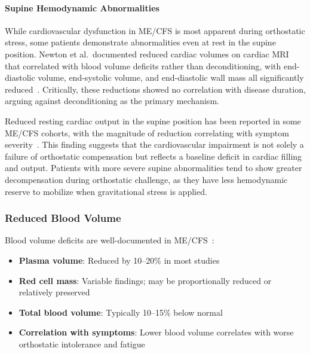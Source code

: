 \paragraph{Supine Hemodynamic Abnormalities}
While cardiovascular dysfunction in ME/CFS is most apparent during orthostatic stress, some patients demonstrate abnormalities even at rest in the supine position. Newton et al.\ documented reduced cardiac volumes on cardiac MRI that correlated with blood volume deficits rather than deconditioning, with end-diastolic volume, end-systolic volume, and end-diastolic wall mass all significantly reduced~\cite{Newton2016}. Critically, these reductions showed no correlation with disease duration, arguing against deconditioning as the primary mechanism.

Reduced resting cardiac output in the supine position has been reported in some ME/CFS cohorts, with the magnitude of reduction correlating with symptom severity~\cite{Newton2016}. This finding suggests that the cardiovascular impairment is not solely a failure of orthostatic compensation but reflects a baseline deficit in cardiac filling and output. Patients with more severe supine abnormalities tend to show greater decompensation during orthostatic challenge, as they have less hemodynamic reserve to mobilize when gravitational stress is applied.

\subsubsection{Reduced Blood Volume}

Blood volume deficits are well-documented in ME/CFS~\cite{Streeten1998blood,Newton2016,Raj2005}:

\begin{itemize}
    \item \textbf{Plasma volume}: Reduced by 10--20\% in most studies~\cite{Streeten1998blood}
    \item \textbf{Red cell mass}: Variable findings; may be proportionally reduced or relatively preserved
    \item \textbf{Total blood volume}: Typically 10--15\% below normal~\cite{Newton2016}
    \item \textbf{Correlation with symptoms}: Lower blood volume correlates with worse orthostatic intolerance and fatigue~\cite{Newton2016}
\end{itemize}

